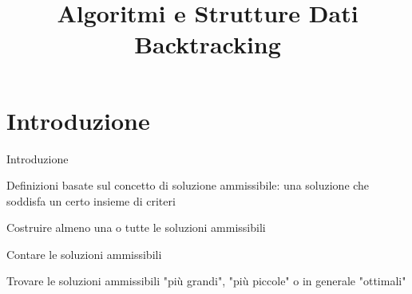 
\title[ASD - Backtracking]{\textbf{Algoritmi e Strutture Dati}\\[24pt]Backtracking}

\usepackage[mode=buildnew]{standalone}
\usepackage{xcolor}
\usepackage{colortbl}
\usepackage{epigraph}
\usepackage{tikz}
\usepackage{xmpmulti}
\usepackage{listings}


\newcommand{\R}[1]{\textcolor{red}{#1}}
\newcommand{\B}[1]{\textcolor{blue}{#1}}

\renewcommand{\arraystretch}{1.4}
\graphicspath{{figs/16/}}

\renewcommand{\enumerazione}{\fontproc{enumeration}}
\newcommand{\isAdmissible}{\fontproc{isAdmissible}}




\FrameTitle{}

\FrameContent



\section{Introduzione}

\begin{frame}{Introduzione}

\vspace{-9pt}

\BI
\item Definizioni basate sul concetto di \alert{soluzione ammissibile}: una soluzione
che soddisfa un certo insieme di criteri
\EI

\BI
\item Costruire almeno una o tutte le soluzioni ammissibili
\item Contare le soluzioni ammissibili
\item Trovare le soluzioni ammissibili "più grandi", "più piccole" o in generale "ottimali"
\EI

\end{frame}


